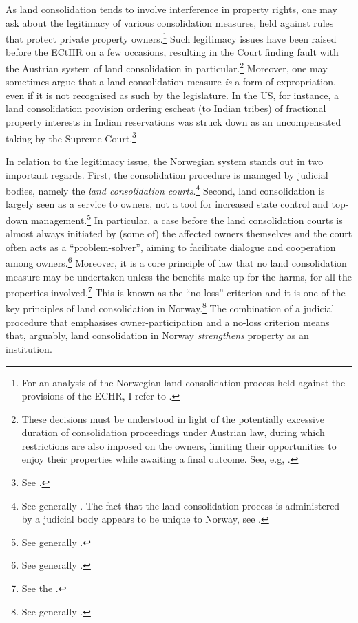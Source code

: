 As land consolidation tends to involve interference in property rights, one may ask about the legitimacy of various consolidation measures, held against rules that protect private property owners.\footnote{For an analysis of the Norwegian land consolidation process held against the provisions of the ECHR, I refer to \cite{utgard09}.} Such legitimacy issues have  been raised before the ECtHR on a few occasions, resulting in the Court finding fault with the Austrian system of land consolidation in particular.\footnote{These decisions must be understood in light of the potentially excessive duration of consolidation proceedings under Austrian law, during which restrictions are also imposed on the owners, limiting their opportunities to enjoy their properties while awaiting a final outcome. See, e.g, \cite{erkner87,poiss87}.} Moreover, one may sometimes argue that a land consolidation measure {\it is} a form of expropriation, even if it is not recognised as such by the legislature. In the US, for instance, a land consolidation provision ordering escheat (to Indian tribes) of fractional property interests in Indian reservations was struck down as an uncompensated taking by the Supreme Court.\footnote{See \cite{hodel87}.}


In relation to the legitimacy issue, the Norwegian system stands out in two important regards. First, the consolidation procedure is managed by judicial bodies, namely the {\it land consolidation courts}.\footnote{See generally \cite{langbach09}. The fact that the land consolidation process is administered by a judicial body appears to be unique to Norway, see \cite[45]{sky01}.} Second, land consolidation is largely seen as a service to owners, not a tool for increased state control and top-down management.\footnote{See generally \cite{sky09}.} In particular, a case before the land consolidation courts is almost always initiated by (some of) the affected owners themselves and the court often acts as a ``problem-solver'', aiming to facilitate dialogue and cooperation among owners.\footnote{See generally \cite{rognes98,rognes03,rognes07}.} Moreover, it is a core principle of law that no land consolidation measure may be undertaken unless the benefits make up for the harms, for all the properties involved.\footnote{See the \cite[3 a)]{lca79}.} This is known as the ``no-loss'' criterion and it is one of the key principles of land consolidation in Norway.\footnote{See generally \cite{rygg98}.} The combination of a judicial procedure that emphasises owner-participation and a no-loss criterion means that, arguably, land consolidation in Norway {\it strengthens} property as an institution.

